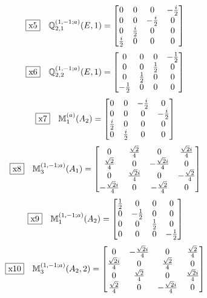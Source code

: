\documentclass[fleqn,10pt,landscape]{jsarticle}
\begin{document}
\begin{dmath*}
\fbox{x5}\quad \mathbb{Q}_{2,1}^{(1,-1;a)}(E,1)=\begin{bmatrix} 0 & 0 & 0 & - \frac{i}{2} \\ 0 & 0 & - \frac{i}{2} & 0 \\ 0 & \frac{i}{2} & 0 & 0 \\ \frac{i}{2} & 0 & 0 & 0 \end{bmatrix}
\end{dmath*}
\begin{dmath*}
\fbox{x6}\quad \mathbb{Q}_{2,2}^{(1,-1;a)}(E,1)=\begin{bmatrix} 0 & 0 & 0 & - \frac{1}{2} \\ 0 & 0 & \frac{1}{2} & 0 \\ 0 & \frac{1}{2} & 0 & 0 \\ - \frac{1}{2} & 0 & 0 & 0 \end{bmatrix}
\end{dmath*}
\begin{dmath*}
\fbox{x7}\quad \mathbb{M}_{1}^{(a)}(A_{2})=\begin{bmatrix} 0 & 0 & - \frac{i}{2} & 0 \\ 0 & 0 & 0 & - \frac{i}{2} \\ \frac{i}{2} & 0 & 0 & 0 \\ 0 & \frac{i}{2} & 0 & 0 \end{bmatrix}
\end{dmath*}
\begin{dmath*}
\fbox{x8}\quad \mathbb{M}_{3}^{(1,-1;a)}(A_{1})=\begin{bmatrix} 0 & \frac{\sqrt{2}}{4} & 0 & \frac{\sqrt{2} i}{4} \\ \frac{\sqrt{2}}{4} & 0 & - \frac{\sqrt{2} i}{4} & 0 \\ 0 & \frac{\sqrt{2} i}{4} & 0 & - \frac{\sqrt{2}}{4} \\ - \frac{\sqrt{2} i}{4} & 0 & - \frac{\sqrt{2}}{4} & 0 \end{bmatrix}
\end{dmath*}
\begin{dmath*}
\fbox{x9}\quad \mathbb{M}_{1}^{(1,-1;a)}(A_{2})=\begin{bmatrix} \frac{1}{2} & 0 & 0 & 0 \\ 0 & - \frac{1}{2} & 0 & 0 \\ 0 & 0 & \frac{1}{2} & 0 \\ 0 & 0 & 0 & - \frac{1}{2} \end{bmatrix}
\end{dmath*}
\begin{dmath*}
\fbox{x10}\quad \mathbb{M}_{3}^{(1,-1;a)}(A_{2},2)=\begin{bmatrix} 0 & - \frac{\sqrt{2} i}{4} & 0 & \frac{\sqrt{2}}{4} \\ \frac{\sqrt{2} i}{4} & 0 & \frac{\sqrt{2}}{4} & 0 \\ 0 & \frac{\sqrt{2}}{4} & 0 & \frac{\sqrt{2} i}{4} \\ \frac{\sqrt{2}}{4} & 0 & - \frac{\sqrt{2} i}{4} & 0 \end{bmatrix}
\end{dmath*}
\end{document}
